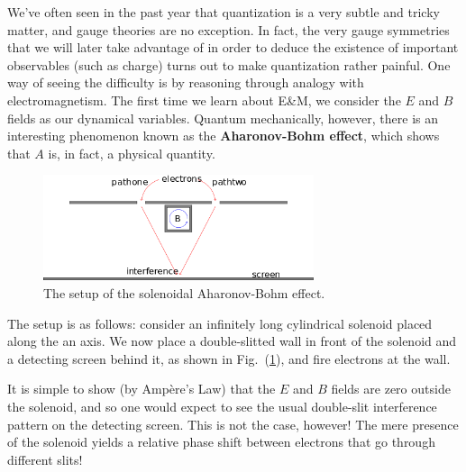\documentclass[12pt]{article}
\begin{document}
We've often seen in the past year that quantization is a very subtle and tricky matter, and gauge theories are no exception.
In fact, the very gauge symmetries that we will later take advantage of in order to deduce the existence of important observables
(such as charge) turns out to make quantization rather painful. One way of seeing the difficulty is by reasoning through analogy
with electromagnetism. The first time we learn about E\&M, we consider the $E$ and $B$ fields as our dynamical variables.
Quantum mechanically, however, there is an interesting phenomenon known as the \textbf{Aharonov-Bohm effect}, which shows that $A$ is, in fact, a physical quantity.
\begin{figure}[h]
	\centering
	\includegraphics[width=300px]{aharanov-bohm.png}
    \caption{The setup of the solenoidal Aharonov-Bohm effect.}
    \label{fig:ab}
\end{figure}
The setup is as follows: consider an infinitely long cylindrical solenoid placed along the an axis. We now place a double-slitted wall in front of the solenoid and a detecting screen behind it, as shown in Fig.~(\ref{fig:ab}), and fire electrons at the wall.

It is simple to show (by Amp\`ere's Law) that the $E$ and $B$ fields are zero outside the solenoid, and so one would expect to see the usual double-slit interference pattern on the detecting screen. This is not the case, however! The mere presence of the solenoid yields a relative phase shift between electrons that go through different slits!
\end{document}
